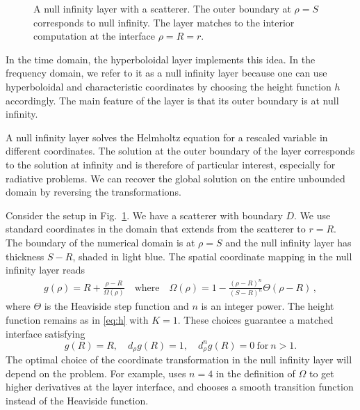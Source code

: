 \documentclass[final,onefignum,onetabnum]{siamart190516}
\begin{document}
\begin{figure}[tbhp]
\centering
{}
\caption{A null infinity layer with a scatterer. The outer boundary at $\rho=S$ corresponds to null infinity. The layer matches to the interior computation at the interface $\rho=R=r$.}
\label{fig:annulus}
\end{figure}

In the time domain, the hyperboloidal layer \cite{ZENGINOGLU20112286} implements this idea. In the frequency domain, we refer to it as a null infinity layer because one can use hyperboloidal and characteristic coordinates by choosing the height function $h$ accordingly. The main feature of the layer is that its outer boundary is at null infinity. 

A null infinity layer solves the Helmholtz equation for a rescaled variable in different coordinates. The solution at the outer boundary of the layer corresponds to the solution at infinity and is therefore of particular interest, especially for radiative problems. We can recover the global solution on the entire unbounded domain by reversing the transformations. 

Consider the setup in Fig.~\ref{fig:annulus}. We have a scatterer with boundary $D$. We use standard coordinates in the domain that extends from the scatterer to $r=R$. The boundary of the numerical domain is at $\rho=S$ and the null infinity layer has thickness $S-R$, shaded in light blue. The spatial coordinate mapping in the null infinity layer reads
\begin{align}\label{eq:layer}
g(\rho)=R+ \frac{\rho-R}{\Omega(\rho)} \quad \mathrm{where} \quad \Omega(\rho) = 1 - \frac{(\rho-R)^n}{(S-R)^n}\Theta(\rho-R)\,,
\end{align}
where $\Theta$ is the Heaviside step function and $n$ is an integer power. The height function remains as in \eqref{eq:h} with $K=1$. These choices guarantee a matched interface satisfying
\[ g(R) = R, \quad d_\rho g(R) = 1, \quad d_\rho^n g(R) = 0 \ \mathrm{for} \ n>1. \] 
The optimal choice of the coordinate transformation in the null infinity layer will depend on the problem. For example, \cite{bernuzzi2011binary} uses $n=4$ in the definition of $\Omega$ to get higher derivatives at the layer interface, and \cite{hilditch2018evolution} chooses a smooth transition function instead of the Heaviside function.
\end{document}
